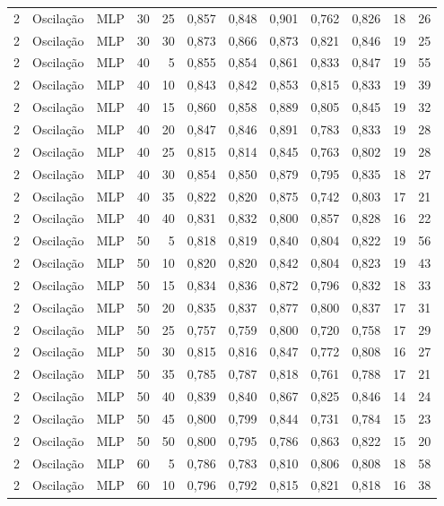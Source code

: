 \begin{longtable}{ccclrrrrrrrr}
2 & Oscilação & MLP & 30 & 25 & 0,857 & 0,848 & 0,901 & 0,762 & 0,826 & 18 & 26 \\
2 & Oscilação & MLP & 30 & 30 & 0,873 & 0,866 & 0,873 & 0,821 & 0,846 & 19 & 25 \\
2 & Oscilação & MLP & 40 & 5 & 0,855 & 0,854 & 0,861 & 0,833 & 0,847 & 19 & 55 \\
2 & Oscilação & MLP & 40 & 10 & 0,843 & 0,842 & 0,853 & 0,815 & 0,833 & 19 & 39 \\
2 & Oscilação & MLP & 40 & 15 & 0,860 & 0,858 & 0,889 & 0,805 & 0,845 & 19 & 32 \\
2 & Oscilação & MLP & 40 & 20 & 0,847 & 0,846 & 0,891 & 0,783 & 0,833 & 19 & 28 \\
2 & Oscilação & MLP & 40 & 25 & 0,815 & 0,814 & 0,845 & 0,763 & 0,802 & 19 & 28 \\
2 & Oscilação & MLP & 40 & 30 & 0,854 & 0,850 & 0,879 & 0,795 & 0,835 & 18 & 27 \\
2 & Oscilação & MLP & 40 & 35 & 0,822 & 0,820 & 0,875 & 0,742 & 0,803 & 17 & 21 \\
2 & Oscilação & MLP & 40 & 40 & 0,831 & 0,832 & 0,800 & 0,857 & 0,828 & 16 & 22 \\
2 & Oscilação & MLP & 50 & 5 & 0,818 & 0,819 & 0,840 & 0,804 & 0,822 & 19 & 56 \\
2 & Oscilação & MLP & 50 & 10 & 0,820 & 0,820 & 0,842 & 0,804 & 0,823 & 19 & 43 \\
2 & Oscilação & MLP & 50 & 15 & 0,834 & 0,836 & 0,872 & 0,796 & 0,832 & 18 & 33 \\
2 & Oscilação & MLP & 50 & 20 & 0,835 & 0,837 & 0,877 & 0,800 & 0,837 & 17 & 31 \\
2 & Oscilação & MLP & 50 & 25 & 0,757 & 0,759 & 0,800 & 0,720 & 0,758 & 17 & 29 \\
2 & Oscilação & MLP & 50 & 30 & 0,815 & 0,816 & 0,847 & 0,772 & 0,808 & 16 & 27 \\
2 & Oscilação & MLP & 50 & 35 & 0,785 & 0,787 & 0,818 & 0,761 & 0,788 & 17 & 21 \\
2 & Oscilação & MLP & 50 & 40 & 0,839 & 0,840 & 0,867 & 0,825 & 0,846 & 14 & 24 \\
2 & Oscilação & MLP & 50 & 45 & 0,800 & 0,799 & 0,844 & 0,731 & 0,784 & 15 & 23 \\
2 & Oscilação & MLP & 50 & 50 & 0,800 & 0,795 & 0,786 & 0,863 & 0,822 & 15 & 20 \\
2 & Oscilação & MLP & 60 & 5 & 0,786 & 0,783 & 0,810 & 0,806 & 0,808 & 18 & 58 \\
2 & Oscilação & MLP & 60 & 10 & 0,796 & 0,792 & 0,815 & 0,821 & 0,818 & 16 & 38 \\

\end{longtable}
